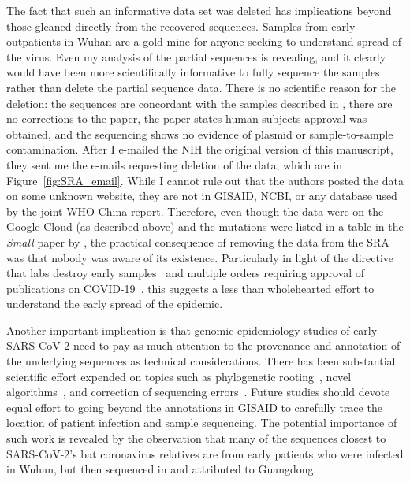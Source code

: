 \documentclass[9pt,twocolumn,twoside]{gsajnl_modified}
\begin{document}
The fact that such an informative data set was deleted has implications beyond those gleaned directly from the recovered sequences.
Samples from early outpatients in Wuhan are a gold mine for anyone seeking to understand spread of the virus.
Even my analysis of the partial sequences is revealing, and it clearly would have been more scientifically informative to fully sequence the samples rather than delete the partial sequence data.
There is no scientific reason for the deletion: the sequences are concordant with the samples described in \citet{wang2020medRxiv,wang2020small}, there are no corrections to the paper, the paper states human subjects approval was obtained, and the sequencing shows no evidence of plasmid or sample-to-sample contamination.
After I e-mailed the NIH the original version of this manuscript, they sent me the e-mails requesting deletion of the data, which are in Figure~\ref{fig:SRA_email}.
While I cannot rule out that the authors posted the data on some unknown website, they are not in GISAID, NCBI, or any database used by the joint WHO-China report.
Therefore, even though the data were on the Google Cloud (as described above) and the mutations were listed in a table in the \textit{Small} paper by \citet{wang2020small}, the practical consequence of removing the data from the SRA was that nobody was aware of its existence.
Particularly in light of the directive that labs destroy early samples~\citep{pinghui2020SCMP} and multiple orders requiring approval of publications on COVID-19~\citep{chinacdc2020, Kang2020}, this suggests a less than wholehearted effort to understand the early spread of the epidemic.

Another important implication is that genomic epidemiology studies of early SARS-CoV-2 need to pay as much attention to the provenance and annotation of the underlying sequences as technical considerations.
There has been substantial scientific effort expended on topics such as phylogenetic rooting~\citep{pipes2021assessing, morel2021phylogenetic}, novel algorithms~\citep{kumar2021evolutionary}, and correction of sequencing errors~\citep{turakhia2020stability}.
Future studies should devote equal effort to going beyond the annotations in GISAID to carefully trace the location of patient infection and sample sequencing.
The potential importance of such work is revealed by the observation that many of the sequences closest to SARS-CoV-2's bat coronavirus relatives are from early patients who were infected in Wuhan, but then sequenced in and attributed to Guangdong.
\end{document}
